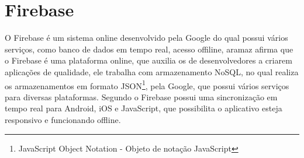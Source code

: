 \section{Firebase}
O Firebase é um sistema online desenvolvido pela Google do qual possui vários serviços, como banco de dados em tempo real, acesso offiline, aramaz
 afirma que o Firebase é uma plataforma online, que auxilia os de desenvolvedores a criarem aplicações de qualidade, ele trabalha com armazenamento NoSQL, no qual realiza os armazenamentos em formato JSON\footnote{JavaScript Object Notation - Objeto de notação JavaScript}, pela Google, que possui vários serviços para diversas plataformas. Segundo  o Firebase possui uma sincronização em tempo real para Android, iOS e JavaScript, que possibilita o aplicativo esteja responsivo e funcionando offline.
